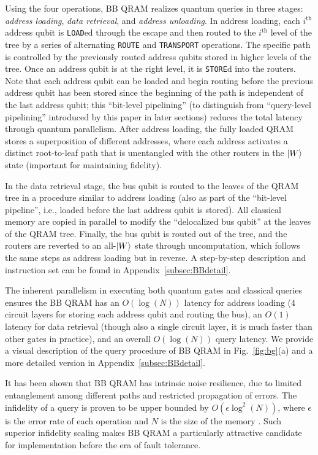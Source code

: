 Using the four operations, BB QRAM realizes quantum queries in three stages: \emph{address loading}, \emph{data retrieval}, and \emph{address unloading}. In address loading, each $i^{\text{th}}$ address qubit is \texttt{LOAD}ed through the escape and then routed to the $i^{\text{th}}$ level of the tree by a series of alternating \texttt{ROUTE} and \texttt{TRANSPORT} operations. The specific path is controlled by the previously routed address qubits stored in higher levels of the tree. Once an address qubit is at the right level, it is \texttt{STORE}d into the routers. Note that each address qubit can be loaded and begin routing before the previous address qubit has been stored since the beginning of the path is independent of the last address qubit; this ``bit-level pipelining'' (to distinguish from ``query-level pipelining'' introduced by this paper in later sections) reduces the total latency through quantum parallelism. After address loading, the fully loaded QRAM stores a superposition of different addresses, where each address activates a distinct root-to-leaf path that is unentangled with the other routers in the $\ket{W}$ state (important for maintaining fidelity).

In the data retrieval stage, the bus qubit is routed to the leaves of the QRAM tree in a procedure similar to address loading (also as part of the ``bit-level pipeline'', i.e., loaded before the last address qubit is stored). All classical memory are copied in parallel to modify the ``delocalized bus qubit'' at the leaves of the QRAM tree. Finally, the bus qubit is routed out of the tree, and the routers are reverted to an all-$\ket{W}$ state through uncomputation, which follows the same steps as address loading but in reverse. A step-by-step description and instruction set can be found in Appendix~\ref{subsec:BBdetail}.

The inherent parallelism in executing both quantum gates and classical queries ensures the BB QRAM has an $O(\log(N))$ latency for address loading (4 circuit layers for storing each address qubit and routing the bus), an $O(1)$ latency for data retrieval (though also a single circuit layer, it is much faster than other gates in practice), and an overall $O(\log(N))$ query latency. We provide a visual description of the query procedure of BB QRAM in Fig.~\ref{fig:bg}(a) and a more detailed version in Appendix~\ref{subsec:BBdetail}.

It has been shown that BB QRAM has intrinsic noise resilience, due to limited entanglement among different paths and restricted propagation of errors. The infidelity of a query is proven to be upper bounded by $O(\epsilon\log^2(N))$, where $\epsilon$ is the error rate of each operation and $N$ is the size of the memory \cite{hann}. Such superior infidelity scaling makes BB QRAM a particularly attractive candidate for implementation before the era of fault tolerance.
